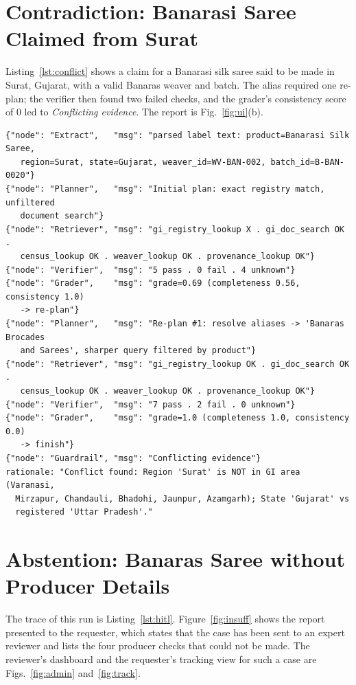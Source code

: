 \section{Contradiction: Banarasi Saree Claimed from Surat}

Listing~\ref{lst:conflict} shows a claim for a Banarasi silk saree said to be made in Surat, Gujarat,
with a valid Banaras weaver and batch. The alias required one re-plan; the verifier then found two
failed checks, and the grader's consistency score of 0 led to \emph{Conflicting evidence}. The report is
Fig.~\ref{fig:ui}(b).

\begin{lstlisting}[language={},caption={Trace of a conflicting claim (case REPORT-TRACE-3)},label={lst:conflict}]
{"node": "Extract",   "msg": "parsed label text: product=Banarasi Silk Saree,
   region=Surat, state=Gujarat, weaver_id=WV-BAN-002, batch_id=B-BAN-0020"}
{"node": "Planner",   "msg": "Initial plan: exact registry match, unfiltered
   document search"}
{"node": "Retriever", "msg": "gi_registry_lookup X . gi_doc_search OK .
   census_lookup OK . weaver_lookup OK . provenance_lookup OK"}
{"node": "Verifier",  "msg": "5 pass . 0 fail . 4 unknown"}
{"node": "Grader",    "msg": "grade=0.69 (completeness 0.56, consistency 1.0)
   -> re-plan"}
{"node": "Planner",   "msg": "Re-plan #1: resolve aliases -> 'Banaras Brocades
   and Sarees', sharper query filtered by product"}
{"node": "Retriever", "msg": "gi_registry_lookup OK . gi_doc_search OK .
   census_lookup OK . weaver_lookup OK . provenance_lookup OK"}
{"node": "Verifier",  "msg": "7 pass . 2 fail . 0 unknown"}
{"node": "Grader",    "msg": "grade=1.0 (completeness 1.0, consistency 0.0)
   -> finish"}
{"node": "Guardrail", "msg": "Conflicting evidence"}
rationale: "Conflict found: Region 'Surat' is NOT in GI area (Varanasi,
  Mirzapur, Chandauli, Bhadohi, Jaunpur, Azamgarh); State 'Gujarat' vs
  registered 'Uttar Pradesh'."
\end{lstlisting}

\section{Abstention: Banaras Saree without Producer Details}

The trace of this run is Listing~\ref{lst:hitl}. Figure~\ref{fig:insuff} shows the report presented to
the requester, which states that the case has been sent to an expert reviewer and lists the four
producer checks that could not be made. The reviewer's dashboard and the requester's tracking view for
such a case are Figs.~\ref{fig:admin} and~\ref{fig:track}.

